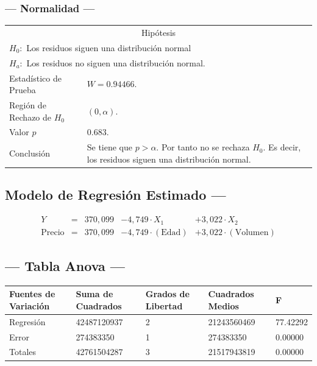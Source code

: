 \subsubsection{--- Normalidad ---} %
\begin{center}
  \begin{tabular}{|l|p{8cm}|}
    \cline{1-2}
    \multicolumn{2}{|c|}{Hipótesis}\\ \cline{1-2}
    \multicolumn{2}{|l|}{\(H_0:\) Los residuos siguen una distribución normal} \\ 
    \multicolumn{2}{|l|}{\(H_a:\) Los residuos no siguen una distribución normal.} \\ \cline{1-2}
    Estadístico de Prueba & \(W = 0.94466\).\\ \cline{1-2} 
		Región de Rechazo de \(H_0\) & \((0, \alpha )\).\\ \cline{1-2} 
    Valor \(p\) & \(0.683\).\\ \cline{1-2} 
    Conclusión & Se tiene que \(p> \alpha\). \newline 
		Por tanto no se rechaza \(H_0\). \newline 
		Es decir, los residuos siguen una distribución normal.\\ \cline{1-2} 
  \end{tabular}
\end{center}


\subsection{\centering Modelo de Regresión Estimado ---} %
\begin{align}
	Y & = &              370,099 & - 4,749 \cdot X_1           & + 3,022     \cdot X_2   \\[2mm]
	\mbox{Precio} & = &  370,099 & - 4,749 \cdot (\mbox{Edad}) & + 3,022     \cdot (\mbox{Volumen})
	\label{eq:3}
\end{align}

\subsection{\centering --- Tabla Anova ---} %
\begin{center}
  \begin{tabular}{|l|l|l|l|l|}
    \hline 
Fuentes de Variación  & Suma de Cuadrados & Grados de Libertad & Cuadrados Medios & F\\ \hline 
Regresión  &  42487120937          &  2     &  21243560469 & 77.42292 \\ \hline
Error      &    274383350          &  1     &    274383350 &  0.00000 \\ \hline
Totales    &  42761504287          &  3     &  21517943819 &  0.00000 \\ \hline
  \end{tabular}
\end{center} 

